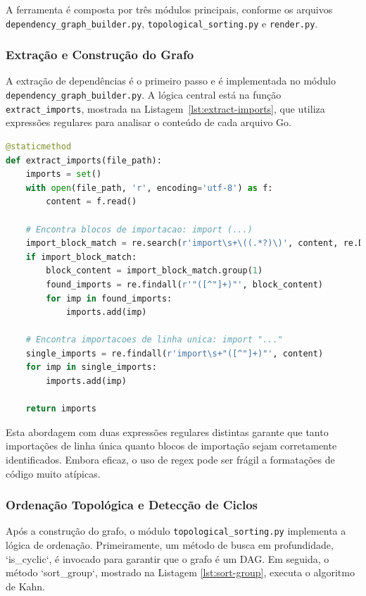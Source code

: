 \documentclass[12pt]{article}
\begin{document}
A ferramenta é composta por três módulos principais, conforme os arquivos \texttt{dependency\_graph\_builder.py}, \texttt{topological\_sorting.py} e \texttt{render.py}.

\subsubsection{Extração e Construção do Grafo}
A extração de dependências é o primeiro passo e é implementada no módulo \texttt{dependency\_graph\_builder.py}. A lógica central está na função \texttt{extract\_imports}, mostrada na Listagem~\ref{lst:extract-imports}, que utiliza expressões regulares para analisar o conteúdo de cada arquivo Go.

\begin{lstlisting}[language=Python, caption={Trecho do código de extração de importações.}, label={lst:extract-imports}]
@staticmethod
def extract_imports(file_path):
    imports = set()
    with open(file_path, 'r', encoding='utf-8') as f:
        content = f.read()

    # Encontra blocos de importacao: import (...)
    import_block_match = re.search(r'import\s+\((.*?)\)', content, re.DOTALL)
    if import_block_match:
        block_content = import_block_match.group(1)
        found_imports = re.findall(r'"([^"]+)"', block_content)
        for imp in found_imports:
            imports.add(imp)

    # Encontra importacoes de linha unica: import "..."
    single_imports = re.findall(r'import\s+"([^"]+)"', content)
    for imp in single_imports:
        imports.add(imp)

    return imports
\end{lstlisting}

Esta abordagem com duas expressões regulares distintas garante que tanto importações de linha única quanto blocos de importação sejam corretamente identificados. Embora eficaz, o uso de regex pode ser frágil a formatações de código muito atípicas.

\subsubsection{Ordenação Topológica e Detecção de Ciclos}
Após a construção do grafo, o módulo \texttt{topological\_sorting.py} implementa a lógica de ordenação. Primeiramente,
um método de busca em profundidade, `is{\_}cyclic`, é invocado para garantir que o grafo é um DAG. Em seguida, o método
`sort{\_}group`, mostrado na Listagem \ref{lst:sort-group}, executa o algoritmo de Kahn.
\end{document}
